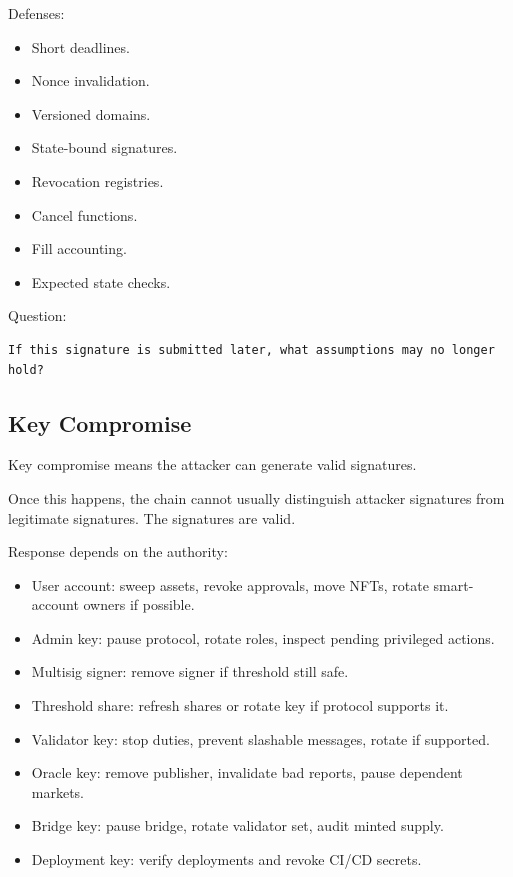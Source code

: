 Defenses:

\begin{itemize}
\tightlist
\item
  Short deadlines.
\item
  Nonce invalidation.
\item
  Versioned domains.
\item
  State-bound signatures.
\item
  Revocation registries.
\item
  Cancel functions.
\item
  Fill accounting.
\item
  Expected state checks.
\end{itemize}

Question:

\begin{lstlisting}
If this signature is submitted later, what assumptions may no longer hold?
\end{lstlisting}

\subsection{Key Compromise}

Key compromise means the attacker can generate valid signatures.

Once this happens, the chain cannot usually distinguish attacker
signatures from legitimate signatures. The signatures are valid.

Response depends on the authority:

\begin{itemize}
\tightlist
\item
  User account: sweep assets, revoke approvals, move NFTs, rotate
  smart-account owners if possible.
\item
  Admin key: pause protocol, rotate roles, inspect pending privileged
  actions.
\item
  Multisig signer: remove signer if threshold still safe.
\item
  Threshold share: refresh shares or rotate key if protocol supports it.
\item
  Validator key: stop duties, prevent slashable messages, rotate if
  supported.
\item
  Oracle key: remove publisher, invalidate bad reports, pause dependent
  markets.
\item
  Bridge key: pause bridge, rotate validator set, audit minted supply.
\item
  Deployment key: verify deployments and revoke CI/CD secrets.
\end{itemize}

